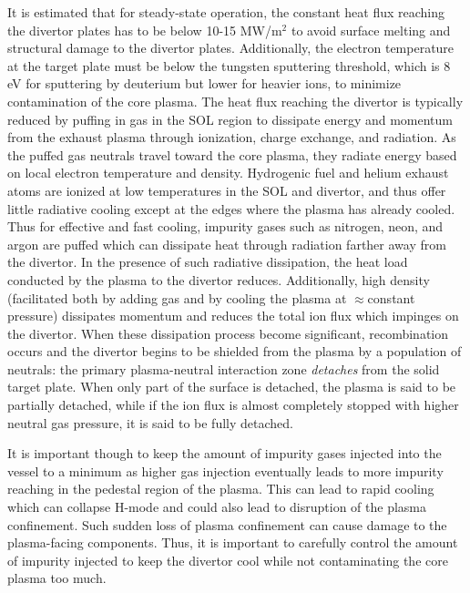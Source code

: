 It is estimated that for steady-state operation, the constant heat flux reaching the divertor plates has to be below 10-15 MW/m$^2$\cite{Pitts_2019_NME} to avoid surface melting and structural damage to the divertor plates.
Additionally, the electron temperature at the target plate must be below the tungsten sputtering threshold, which is 8 eV\cite{Brezinsek_2019_NF} for sputtering by deuterium but lower for heavier ions, to minimize contamination of the core plasma.
The heat flux reaching the divertor is typically reduced by puffing in gas in the \ac{SOL} region to dissipate energy and momentum from the exhaust plasma through ionization, charge exchange, and radiation.
As the puffed gas neutrals travel toward the core plasma, they radiate energy based on local electron temperature and density.
Hydrogenic fuel and helium exhaust atoms are ionized at low temperatures in the \ac{SOL} and divertor, and thus offer little radiative cooling except at the edges where the plasma has already cooled.
Thus for effective and fast cooling, impurity gases such as nitrogen, neon, and argon are puffed which can dissipate heat through radiation farther away from the divertor.
In the presence of such radiative dissipation, the heat load conducted by the plasma to the divertor reduces.
Additionally, high density (facilitated both by adding gas and by cooling the plasma at $\approx$constant pressure) dissipates momentum and reduces the total ion flux which impinges on the divertor.
When these dissipation process become significant, recombination occurs and the divertor begins to be shielded from the plasma by a population of neutrals: the primary plasma-neutral interaction zone \emph{detaches} from the solid target plate.
When only part of the surface is detached, the plasma is said to be partially detached, while if the ion flux is almost completely stopped with higher neutral gas pressure, it is said to be fully detached.

It is important though to keep the amount of impurity gases injected into the vessel to a minimum as higher gas injection eventually leads to more impurity reaching in the pedestal region of the plasma.
This can lead to rapid cooling which can collapse H-mode and could also lead to disruption of the plasma confinement.
Such sudden loss of plasma confinement can cause damage to the plasma-facing components.
Thus, it is important to carefully control the amount of impurity injected to keep the divertor cool while not contaminating the core plasma too much.

